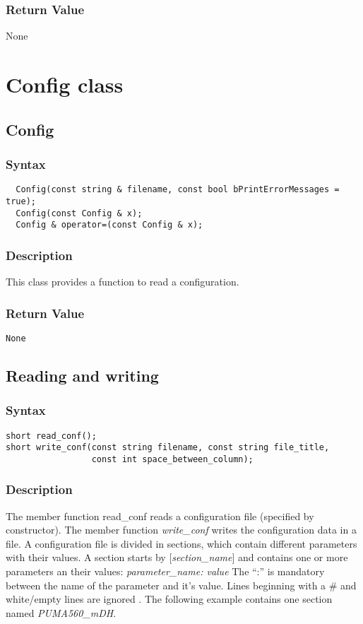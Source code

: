 \documentclass[11pt,fleqn,letterpaper]{report}
\begin{document}
\subsubsection*{Return Value}

None

\newpage

\section{Config class}
\subsection*{Config}
 \subsubsection*{Syntax}
 \begin{verbatim}
  Config(const string & filename, const bool bPrintErrorMessages = true);
  Config(const Config & x);
  Config & operator=(const Config & x);
 \end{verbatim}

\subsubsection*{Description}   
This class provides a function to read a configuration. 

\subsubsection*{Return Value}

{\tt None}
 \newpage 

\subsection*{Reading and writing}
\subsubsection*{Syntax}
\begin{verbatim}
short read_conf();
short write_conf(const string filename, const string file_title,
                 const int space_between_column);
\end{verbatim}

\subsubsection*{Description}   
The member function read\_conf reads a configuration file (specified
by constructor). The member function \emph{write\_conf} writes the
configuration data in a file. A configuration file is divided in
sections, which contain different parameters with their values. A
section starts by $[$\emph{section\_name}$]$ and contains one or more
parameters an their values: \emph{parameter\_name: value} The ``:'' is
mandatory between the name of the parameter and it's value. Lines
beginning with a \# and white/empty lines are ignored .  The following
example contains one section named \emph{PUMA560\_mDH}.
\end{document}

